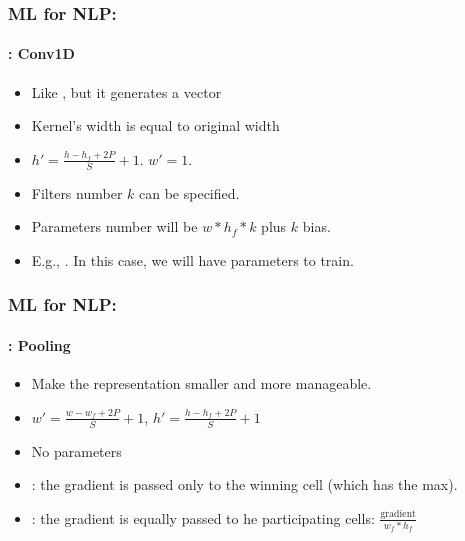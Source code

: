 \documentclass[xcolor=table]{beamer}
\begin{document}
	\begin{frame}
		\frametitle{ML for NLP: \insertsection}
		\framesubtitle{\insertsubsection: Conv1D}
		
		\begin{minipage}{0.62\textwidth} 
			\begin{itemize}
				\item Like , but it generates a vector
				\item Kernel's width is equal to original width
				\item $ h' = \frac{h - h_f + 2P}{S} + 1$. $ w' = 1$.
				\item Filters number $k$ can be specified.
				\item Parameters number will be $w * h_f * k$ plus $k$ bias.
				\item E.g., . In this case, we will have  parameters to train.
			\end{itemize}
		\end{minipage}
		\begin{minipage}{0.37\textwidth}
		\end{minipage}
		
	\end{frame}
	
	\begin{frame}
		\frametitle{ML for NLP: \insertsection}
		\framesubtitle{\insertsubsection: Pooling}
		
		\begin{minipage}{0.60\textwidth} 
			\begin{itemize}
				\item Make the representation smaller and more manageable.
				\item $ w' = \frac{w - w_f + 2P}{S} + 1$,  $ h' = \frac{h - h_f + 2P}{S} + 1$
				\item No parameters 
				\item {}: the gradient is passed only to the winning cell (which has the max).
				\item {}: the gradient is equally passed to he participating cells: $\frac{\text{gradient}}{w_f * h_f}$ 
			\end{itemize}
		\end{minipage}
		\begin{minipage}{0.39\textwidth}
			\hgraphpage[\textwidth]{maxpool.pdf}
		\end{minipage}
		
	\end{frame}
	
\end{document}
